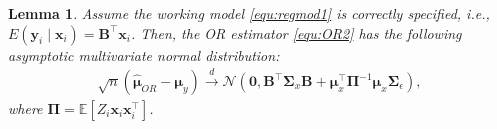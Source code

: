 \documentclass[12pt, A4]{article}
\newtheorem{lemma}{Lemma}
\newcommand{\ObsRes}{\textbf{y}_i}
\newcommand{\ObsCov}{\textbf{x}_i}
\begin{document}
    \begin{lemma}\label{lemma:finite_OR}
       Assume the working model \eqref{equ:regmod1} is correctly specified, i.e., $E(\ObsRes \mid \ObsCov)= \textbf{B}^{\top} \ObsCov$. Then, the OR estimator \eqref{equ:OR2} has the following asymptotic multivariate normal distribution:
       \begin{align*}
           \sqrt{n}(\hat{\boldsymbol{\mu}}_{OR} - \boldsymbol{\mu}_y) \overset{d}{\rightarrow} \mathcal{N}\left(\textbf{0}, \textbf{B}^{\top} \boldsymbol{\Sigma}_{x} \textbf{B} + \boldsymbol{\mu}_x^{\top} \boldsymbol{\Pi}^{-1} \boldsymbol{\mu}_x \boldsymbol{\Sigma}_{\epsilon} \right),
       \end{align*}  
       where $\boldsymbol{\Pi} = \mathbb{E}\left[ Z_i\textbf{x}_i\textbf{x}_i^{\top} \right]$.
    \end{lemma}
\end{document}
